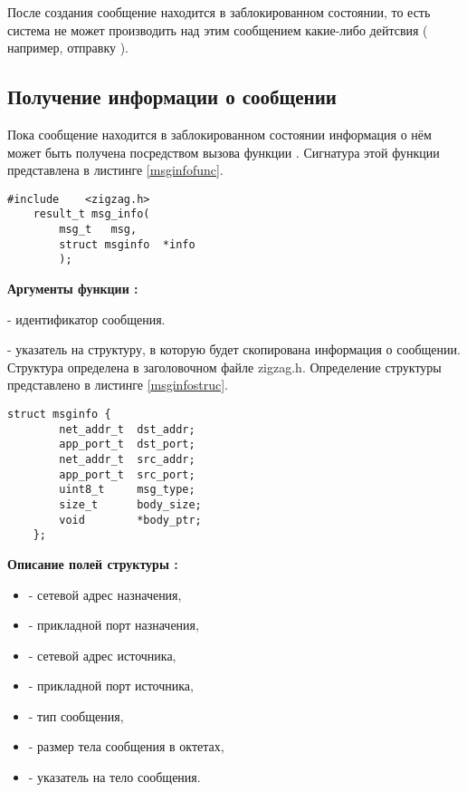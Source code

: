 После создания сообщение находится в заблокированном состоянии, то есть система \zigzag не
может производить над этим сообщением какие-либо дейтсвия ( например, отправку ). 

\subsection{Получение информации о сообщении}

Пока сообщение находится в заблокированном состоянии информация о нём может быть получена посредством
вызова функции . Сигнатура этой функции представлена в листинге \ref{msginfofunc}.

\begin{lstlisting}[caption=Функция \myfunc{msg\_info()} - информация о сообщении, label=msginfofunc ]
    #include    <zigzag.h>
    result_t msg_info(
        msg_t   msg,  
        struct msginfo  *info
        );
\end{lstlisting}

{\bfseries Аргументы функции :}

\begin{enumerate}
{\itshape
\item {} - идентификатор сообщения.
\item {} - указатель на структуру, в которую будет скопирована информация о сообщении. Структура
определена в заголовочном файле zigzag.h. Определение структуры представлено в листинге \ref{msginfostruc}.
}

\begin{lstlisting}[caption=Определение структуры \myarg{msginfo}., label=msginfostruc ]
    struct msginfo {
        net_addr_t  dst_addr;
        app_port_t  dst_port;
        net_addr_t  src_addr;
        app_port_t  src_port;
        uint8_t     msg_type;
        size_t      body_size;
        void        *body_ptr;
    };
\end{lstlisting}

{\bfseries Описание полей структуры :}

{\itshape
\begin{itemize}
\item {} - сетевой адрес назначения,
\item {} - прикладной порт назначения,
\item {} - сетевой адрес источника,
\item {} - прикладной порт источника,
\item {} - тип сообщения,
\item {} - размер тела сообщения в октетах,
\item {} - указатель на тело сообщения.
\end{itemize}
}

\end{enumerate}


